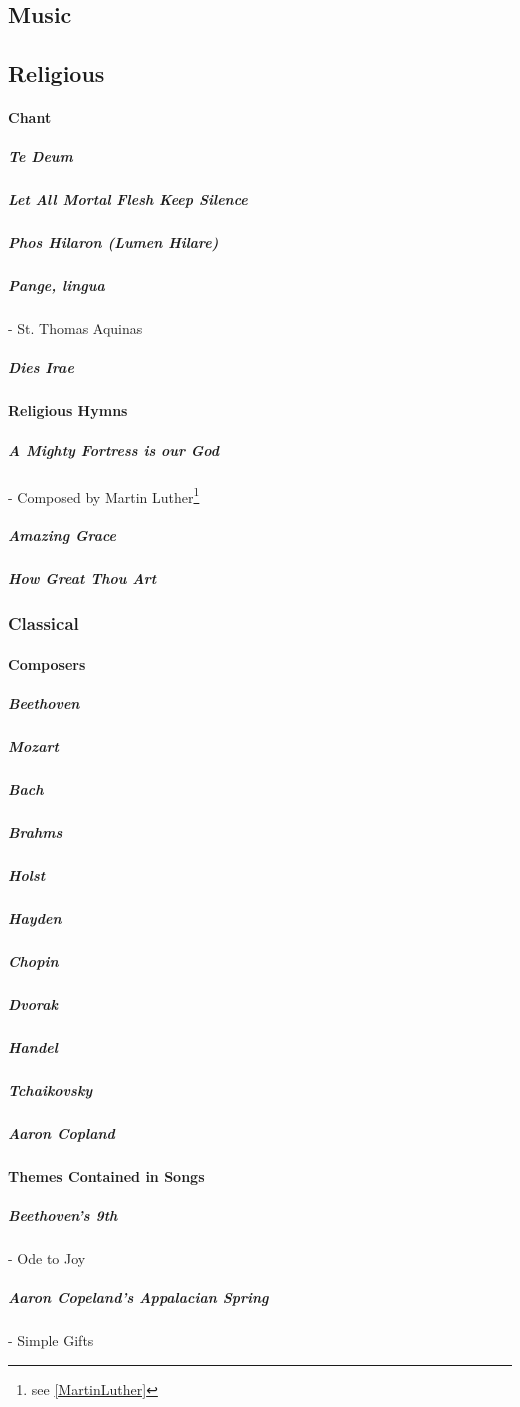 		
		

		
	
		
	
		
		
		\subsection{Music}
			\subsection{Religious}
				\paragraph{Chant}
					\subparagraph{Te Deum}
					\subparagraph{Let All Mortal Flesh Keep Silence}
					\subparagraph{Phos Hilaron (Lumen Hilare)}
					\subparagraph{Pange, lingua} - St. Thomas Aquinas
					\subparagraph{Dies Irae}
				\paragraph{Religious Hymns}
					\subparagraph{A Mighty Fortress is our God} - Composed by Martin Luther\footnote{see \cref{MartinLuther} }
					\subparagraph{Amazing Grace}
					\subparagraph{How Great Thou Art}


					
					
			\subsubsection{Classical}
				\paragraph{Composers}
					\subparagraph{Beethoven}
					\subparagraph{Mozart}
					\subparagraph{Bach}
					\subparagraph{Brahms}
					\subparagraph{Holst}
					\subparagraph{Hayden}
					\subparagraph{Chopin}
					\subparagraph{Dvorak}
					\subparagraph{Handel}
					\subparagraph{Tchaikovsky}
					\subparagraph{Aaron Copland}
					
				
				\paragraph{Themes Contained in Songs}
				
					\subparagraph {Beethoven's 9th} -  Ode to Joy
					\subparagraph{Aaron Copeland's Appalacian Spring} - Simple Gifts
				
			
			\newpage
